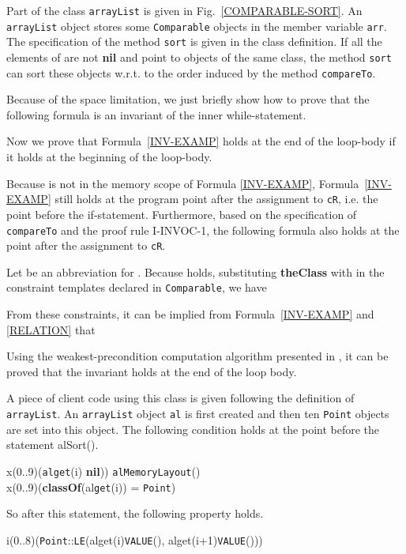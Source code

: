 \documentclass[fleqn]{llncs}
\begin{document}
\begin{example}
Part of the class \texttt{arrayList} is given in Fig.~\ref{COMPARABLE-SORT}. An \texttt{arrayList} object stores some \texttt{Comparable} objects in the member variable \verb"arr".
The specification of the method \texttt{sort} is given in the class definition. If all the elements of  are not \textbf{nil} and point to objects of the same class,
the method \texttt{sort} can sort these objects w.r.t. to the order induced by the method \texttt{compareTo}.

Because of the space limitation, we just briefly show how to prove that the following formula is an invariant of the inner while-statement.

Now we prove that Formula~\ref{INV-EXAMP} holds at the end of the loop-body if it holds at the beginning of the loop-body.

Because  is not in the memory scope of Formula \ref{INV-EXAMP},
Formula~\ref{INV-EXAMP} still holds at the program point after the assignment to \texttt{cR}, i.e. the point before the if-statement.
Furthermore, based on the specification of \texttt{compareTo} and the proof rule \textrm{I-INVOC-1}, the following formula also holds
at the point after the assignment to \texttt{cR}.

Let  be an abbreviation for . Because  holds, substituting \textbf{theClass} with  in the constraint templates declared in \texttt{Comparable},  we have
  
From these constraints, it can be implied from Formula~\ref{INV-EXAMP} and \ref{RELATION} that

Using the weakest-precondition computation algorithm presented in \cite{DBLP:conf/ictac/ZhaoL13}, it can be proved that the invariant holds at the end of the loop body.

A piece of client code using this class is given following the definition of \texttt{arrayList}. An \texttt{arrayList} object \texttt{al} is first created
and then ten \texttt{Point} objects are set into this object.
The following condition holds at the point before the statement al{\fldacc}Sort().
\begin{center}
\begin{minipage}{0.9\textwidth}
x(0..9)(\texttt{al}{\fldacc}\texttt{get}(i)  \textbf{nil}))  \texttt{al}{\fldacc}\texttt{MemoryLayout}() \\
x(0..9)(\textbf{classOf}(al{\fldacc}\texttt{get}(i)) = \texttt{Point})
\end{minipage}
\end{center}
So after this statement, the following property holds.
\begin{center}
i(0..8)(\texttt{Point}::\texttt{LE}(al{\fldacc}get(i){\fldacc}\texttt{VALUE}(), al{\fldacc}get(i+1){\fldacc}\texttt{VALUE}()))
\end{center}
\hfill
\end{example}
\end{document}
